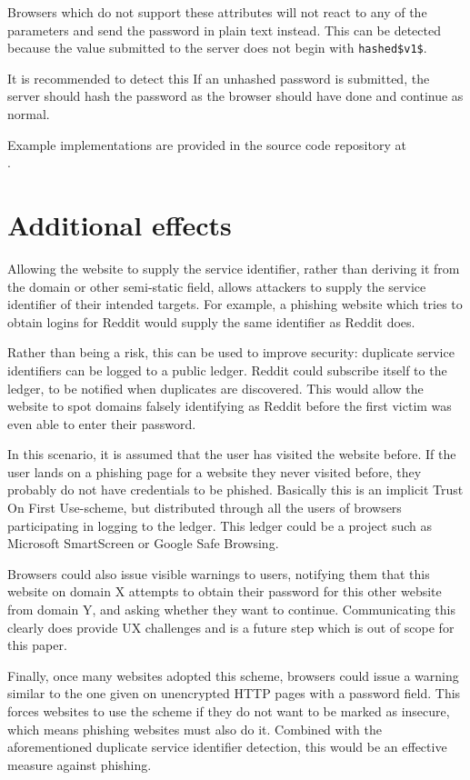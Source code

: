 \documentclass{paper}
\newcommand{\code}[1]{\texttt{\colorbox{gray!11}{#1}}}
\begin{document}
Browsers which do not support these attributes will not react to any of the parameters and
send the password in plain text instead. This can be detected because the value submitted to
the server does not begin with \code{hashed\$v1\$}.

It is recommended to detect this If an unhashed password is submitted, the server should hash
the password as the browser should have done and continue as normal.

Example implementations are provided in the source code repository at \\
{\href{https://github.com/lgommans/browserhashing}{\underline{}}}.

\section{Additional effects}

Allowing the website to supply the service identifier, rather than deriving it from the
domain or other semi-static field, allows attackers to supply the service identifier of their
intended targets. For example, a phishing website which tries to obtain logins for Reddit
would supply the same identifier as Reddit does.

Rather than being a risk, this can be used to improve security: duplicate service identifiers
can be logged to a public ledger. Reddit could subscribe itself to the ledger, to be notified
when duplicates are discovered. This would allow the website to spot domains falsely
identifying as Reddit before the first victim was even able to enter their password.

In this scenario, it is assumed that the user has visited the website before. If the user
lands on a phishing page for a website they never visited before, they probably do not have
credentials to be phished. Basically this is an implicit Trust On First Use-scheme, but
distributed through all the users of browsers participating in logging to the ledger. This
ledger could be a project such as Microsoft SmartScreen or Google Safe Browsing.

Browsers could also issue visible warnings to users, notifying them that this website on
domain X attempts to obtain their password for this other website from domain Y, and asking
whether they want to continue. Communicating this clearly does provide UX challenges and is a
future step which is out of scope for this paper.

Finally, once many websites adopted this scheme, browsers could issue a warning similar to
the one given on unencrypted HTTP pages with a password field. This forces websites to use
the scheme if they do not want to be marked as insecure, which means phishing websites must
also do it. Combined with the aforementioned duplicate service identifier detection, this
would be an effective measure against phishing.
\end{document}
